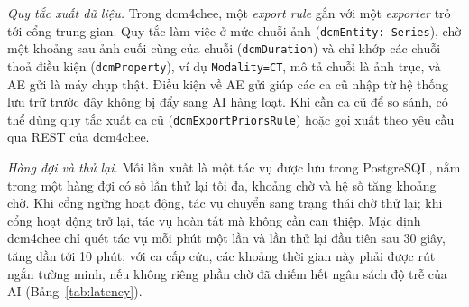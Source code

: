\emph{Quy tắc xuất dữ liệu.} Trong dcm4chee, một \emph{export rule} gắn với một
\emph{exporter} trỏ tới cổng trung gian. Quy tắc làm việc ở mức chuỗi ảnh
(\texttt{dcmEntity: Series}), chờ một khoảng sau ảnh cuối cùng của chuỗi
(\texttt{dcmDuration}) và chỉ khớp các chuỗi thoả điều kiện (\texttt{dcmProperty}), ví
dụ \texttt{Modality=CT}, mô tả chuỗi là ảnh trục, và AE gửi là máy chụp thật. Điều kiện
về AE gửi giúp các ca cũ nhập từ hệ thống lưu trữ trước đây không bị đẩy sang AI hàng
loạt. Khi cần ca cũ để so sánh, có thể dùng quy tắc xuất ca cũ
(\texttt{dcmExportPriorsRule}) hoặc gọi xuất theo yêu cầu qua REST của dcm4chee.

\emph{Hàng đợi và thử lại.} Mỗi lần xuất là một tác vụ được lưu trong PostgreSQL, nằm
trong một hàng đợi có số lần thử lại tối đa, khoảng chờ và hệ số tăng khoảng chờ. Khi
cổng ngừng hoạt động, tác vụ chuyển sang trạng thái chờ thử lại; khi cổng hoạt động trở
lại, tác vụ hoàn tất mà không cần can thiệp. Mặc định dcm4chee chỉ quét tác vụ mỗi phút
một lần và lần thử lại đầu tiên sau 30 giây, tăng dần tới 10 phút; với ca cấp cứu, các
khoảng thời gian này phải được rút ngắn tường minh, nếu không riêng phần chờ đã chiếm hết
ngân sách độ trễ của AI (Bảng~\ref{tab:latency}).

